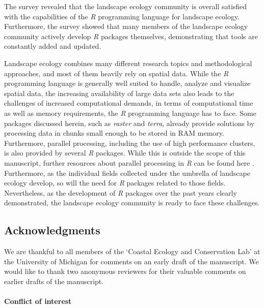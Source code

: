 \documentclass[smallextended]{svjour3}       %
\begin{document}
The survey revealed that the landscape ecology community is overall satisfied with the capabilities of the \textit{R} programming language for landscape ecology.
Furthermore, the survey showed that many members of the landscape ecology community actively develop \textit{R} packages themselves, demonstrating that tools are constantly added and updated.

Landscape ecology combines many different research topics and methodological approaches, and most of them heavily rely on spatial data.
While the \textit{R} programming language is generally well suited to handle, analyze and visualize spatial data, the increasing availability of large data sets also leads to the challenges of increased computational demands, in terms of computational time as well as memory requirements, the \textit{R} programming language has to face.
Some packages discussed herein, such as \textit{raster} and \textit{terra}, already provide solutions by processing data in chunks small enough to be stored in RAM memory.
Furthermore, parallel processing, including the use of high performance clusters, is also provided by several \textit{R} packages.
While this is outside the scope of this manuscript, further resources about parallel processing in \textit{R} can be found here \cite{Bengtsson2020,Schubert2019,McCallum2012}.
Furthermore, as the individual fields collected under the umbrella of landscape ecology develop, so will the need for \textit{R} packages related to those fields.
Nevertheless, as the development of \textit{R} packages over the past years clearly demonstrated, the landscape ecology community is ready to face these challenges.

\FloatBarrier

\hypertarget{acknowledgments}{%
\subsection{Acknowledgments}\label{acknowledgments}}

We are thankful to all members of the `Coastal Ecology and Conservation Lab' at the University of Michigan for comments on an early draft of the manuscript.
We would like to thank two anonymous reviewers for their valuable comments on earlier drafts of the manuscript.

\hypertarget{conflict-of-interest}{%
\paragraph{Conflict of interest}\label{conflict-of-interest}}
\end{document}
